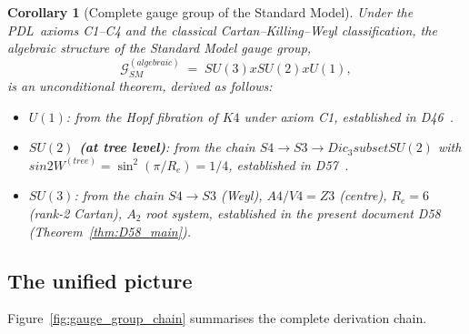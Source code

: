 \documentclass[11pt,a4paper]{article}
\def\Sfour{S4}%
\def\Vfour{V4}%
\def\Afour{A4}%
\def\Sthree{S3}%
\def\Zthree{Z3}%
\def\SUthree{SU(3)}%
\def\SUtwo{SU(2)}%
\def\Uone{U(1)}%
\def\Kfour{K4}%
\def\Re{Re}%
\def\PDL{PDL}%
\def\times{x}%
\def\subset{ subset }%
\def\Dic{Dic}%
\def\sinW{sin2W}%
\def\thetaW{thetaW}%
\def\mathbb#1{#1}%
\def\mathrm#1{#1}%
\def\textsc#1{#1}%
\theoremstyle{plain}
\newtheorem{corollary}[theorem]{Corollary}
\theoremstyle{definition}
\theoremstyle{remark}
\newcommand{\PDL}{\textsc{PDL}}
\newcommand{\Kfour}{K_4}
\newcommand{\Sfour}{S_4}
\newcommand{\Afour}{A_4}
\newcommand{\Vfour}{V_4}
\newcommand{\Sthree}{S_3}
\newcommand{\Zthree}{\mathbb{Z}_3}
\newcommand{\SUthree}{\mathrm{SU}(3)}
\newcommand{\SUtwo}{\mathrm{SU}(2)}
\newcommand{\Uone}{\mathrm{U}(1)}
\newcommand{\Dic}{\mathrm{Dic}}
\renewcommand{\Re}{R_e}
\newcommand{\thetaW}{\theta_W}
\newcommand{\sinW}{\sin^2\!\thetaW}
\begin{document}
\begin{corollary}[Complete gauge group of the Standard Model]
\label{cor:SM_gauge_group}
Under the \PDL\ axioms C1--C4 and the classical Cartan--Killing--Weyl classification, the algebraic structure of the Standard Model gauge group,
\begin{equation}
\mathcal{G}_{\mathrm{SM}}^{(\mathrm{algebraic})} \;=\; \SUthree \times \SUtwo \times \Uone,
\label{eq:SM_gauge_group}
\end{equation}
is an unconditional theorem, derived as follows:
\begin{itemize}[leftmargin=2em]
\item \textbf{$\Uone$}: from the Hopf fibration of $\Kfour$ under axiom C1, established in D46~\cite{PDL_D46}.
\item \textbf{$\SUtwo$ (at tree level)}: from the chain $\Sfour \to \Sthree \to \Dic_3 \subset \SUtwo$ with $\sinW^{(\mathrm{tree})} = \sin^2(\pi/\Re) = 1/4$, established in D57~\cite{PDL_D57}.
\item \textbf{$\SUthree$}: from the chain $\Sfour \to \Sthree$ (Weyl), $\Afour/\Vfour = \Zthree$ (centre), $\Re = 6$ (rank-2 Cartan), $A_2$ root system, established in the present document D58 (Theorem~\ref{thm:D58_main}).
\end{itemize}
\end{corollary}

\subsection{The unified picture}

Figure~\ref{fig:gauge_group_chain} summarises the complete derivation chain.
\end{document}
